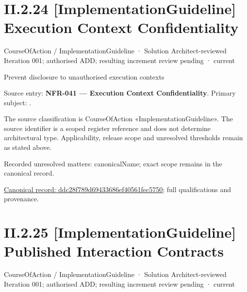 \section*{II.2.24 [ImplementationGuideline] Execution Context Confidentiality}
\label{navigation:II.2.24}

\label{element:ddc28f789d69433686ef40561fec5750}
{\small CourseOfAction / ImplementationGuideline · Solution Architect-reviewed Iteration 001; authorised ADD; resulting increment review pending · current}\par

Prevent disclosure to unauthorised execution contexts



Source entry: \textbf{NFR-041 — Execution Context Confidentiality}. Primary subject: \texttt{}.



The source classification is CourseOfAction «ImplementationGuideline». The source identifier is a scoped register reference and does not determine architectural type. Applicability, release scope and unresolved thresholds remain as stated above.


{\small Recorded unresolved matters: canonicalName; exact scope remains in the canonical record.}\par
{\footnotesize \href{../../../../../../../continuum/strategy/course-of-action/implementation-guideline/ddc28f789d69433686ef40561fec5750.md}{Canonical record: ddc28f789d69433686ef40561fec5750}; full qualifications and provenance.}\par
\section*{II.2.25 [ImplementationGuideline] Published Interaction Contracts}
\label{navigation:II.2.25}

\label{element:b21633d8a1554688baf8704264c63608}
{\small CourseOfAction / ImplementationGuideline · Solution Architect-reviewed Iteration 001; authorised ADD; resulting increment review pending · current}\par

